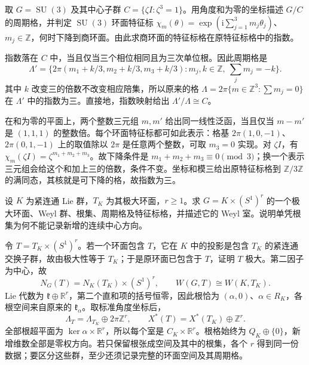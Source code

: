 \begin{exercise}\label{g1:ex:su3-central-quotient-lattice}
	取 \(G=\operatorname{SU}(3)\) 及其中心子群 \(C=\{\zeta I:\zeta^3=1\}\)。用角度和为零的坐标描述 \(G/C\) 的周期格，并判定 \(\operatorname{SU}(3)\) 环面特征标
	\(\chi_m(\theta)=\exp(\mathrm{i}\sum_{j=1}^3m_j\theta_j)\)、\(m_j\in\mathbb Z\)，何时下降到商环面。由此求商环面的特征标格在原特征标格中的指数。
\end{exercise}
\begin{solution}
	指数落在 \(C\) 中，当且仅当三个相位相同且为三次单位根。因此周期格是
	\[
		\Lambda'=
		\{2\pi(m_1+k/3,m_2+k/3,m_3+k/3):
		m_j,k\in\mathbb Z,\ \sum_jm_j=-k\}.
	\]
	其中 \(k\) 改变三的倍数不改变相应陪集，所以原来的格 \(\Lambda=2\pi\{m\in\mathbb Z^3:\sum m_j=0\}\) 在 \(\Lambda'\) 中的指数为三。直接地，指数映射给出 \(\Lambda'/\Lambda\cong C\)。

	在和为零的平面上，两个整数三元组 \(m,m'\) 给出同一线性泛函，当且仅当 \(m-m'\) 是 \((1,1,1)\) 的整数倍。每个环面特征标都可如此表示：格基 \(2\pi(1,0,-1)\)、\(2\pi(0,1,-1)\) 上的取值除以 \(2\pi\) 是任意两个整数，可取 \(m_3=0\) 实现。对 \(\zeta I\)，有 \(\chi_m(\zeta I)=\zeta^{m_1+m_2+m_3}\)。故下降条件是 \(m_1+m_2+m_3\equiv0\pmod3\)；换一个表示三元组会给这个和加上三的倍数，条件不变。坐标和模三给出原特征标格到 \(\mathbb Z/3\mathbb Z\) 的满同态，其核就是可下降的格，故指数为三。
\end{solution}

\begin{exercise}\label{g1:ex:root-data-central-torus}
	设 \(K\) 为紧连通 Lie 群，\(T_K\) 为其极大环面，\(r\ge1\)。求 \(G=K\times(S^1)^r\) 的一个极大环面、Weyl 群、根集、周期格及特征标格，并描述它的 Weyl 室。说明单凭根集为何不能记录新增的连续中心方向。
\end{exercise}
\begin{solution}
	令 \(T=T_K\times(S^1)^r\)。若一个环面包含 \(T\)，它在 \(K\) 中的投影是包含 \(T_K\) 的紧连通交换子群，故由极大性等于 \(T_K\)；于是原环面已包含于 \(T\)，证明 \(T\) 极大。第二因子为中心，故
	\[
		N_G(T)=N_K(T_K)\times(S^1)^r,\qquad
		W(G,T)\cong W(K,T_K).
	\]
	Lie 代数为 \(\mathfrak k\oplus\mathbb R^r\)，第二个直和项的括号恒零，因此根恰为 \((\alpha,0)\)、\(\alpha\in R_K\)，各根空间来自原来的 \(\mathfrak k_\alpha\)。取标准角度坐标后，
	\[
		\Lambda_T=\Lambda_{T_K}\oplus2\pi\mathbb Z^r,\qquad
		X^*(T)=X^*(T_K)\oplus\mathbb Z^r.
	\]
	全部根超平面为 \(\ker\alpha\times\mathbb R^r\)，所以每个室是 \(C_K\times\mathbb R^r\)。根格始终为 \(Q_K\oplus\{0\}\)，新增维数全部是零权方向。若只保留根张成空间及其中的根集，各个 \(r\) 得到同一份数据；要区分这些群，至少还须记录完整的环面空间及其周期格。
\end{solution}

